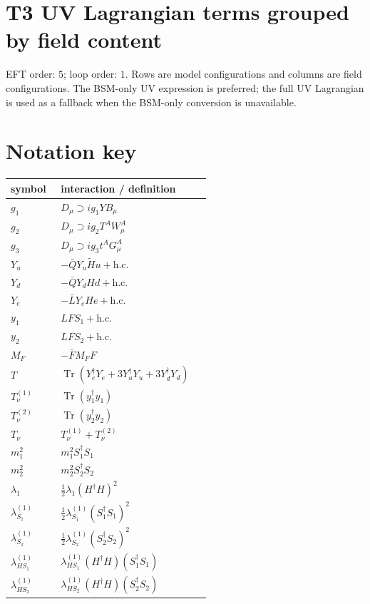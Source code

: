 \documentclass[8pt]{article}
\begin{document}
\begin{landscape}
\section*{T3 UV Lagrangian terms grouped by field content}
EFT order: $5$; loop order: $1$. 
Rows are model configurations and columns are field configurations. The BSM-only UV expression is preferred; the full UV Lagrangian is used as a fallback when the BSM-only conversion is unavailable.
\section*{Notation key}
\begin{longtable}{@{}p{0.23\linewidth}p{0.69\linewidth}@{}}
\toprule
symbol & interaction / definition \\
\midrule
$g_1$ & $D_\mu\supset i g_1YB_\mu$ \\
$g_2$ & $D_\mu\supset i g_2T^AW_\mu^A$ \\
$g_3$ & $D_\mu\supset i g_3t^AG_\mu^A$ \\
$Y_u$ & $-\bar QY_u\widetilde Hu+\mathrm{h.c.}$ \\
$Y_d$ & $-\bar QY_dHd+\mathrm{h.c.}$ \\
$Y_e$ & $-\bar LY_eHe+\mathrm{h.c.}$ \\
$y_1$ & $LFS_1+\mathrm{h.c.}$ \\
$y_2$ & $LFS_2+\mathrm{h.c.}$ \\
$M_F$ & $-\bar FM_FF$ \\
$T$ & $\operatorname{Tr}(Y_e^\dagger Y_e+3Y_u^\dagger Y_u+3Y_d^\dagger Y_d)$ \\
$T_\nu^{(1)}$ & $\operatorname{Tr}(y_1^\dagger y_1)$ \\
$T_\nu^{(2)}$ & $\operatorname{Tr}(y_2^\dagger y_2)$ \\
$T_\nu$ & $T_\nu^{(1)}+T_\nu^{(2)}$ \\
$m_1^2$ & $m_1^2S_1^\dagger S_1$ \\
$m_2^2$ & $m_2^2S_2^\dagger S_2$ \\
$\lambda_1$ & $\frac12\lambda_1(H^\dagger H)^2$ \\
$\lambda_{S_1}^{(1)}$ & $\frac12\lambda_{S_1}^{(1)}(S_1^\dagger S_1)^2$ \\
$\lambda_{S_2}^{(1)}$ & $\frac12\lambda_{S_2}^{(1)}(S_2^\dagger S_2)^2$ \\
$\lambda_{HS_1}^{(1)}$ & $\lambda_{HS_1}^{(1)}(H^\dagger H)(S_1^\dagger S_1)$ \\
$\lambda_{HS_2}^{(1)}$ & $\lambda_{HS_2}^{(1)}(H^\dagger H)(S_2^\dagger S_2)$ \\

\end{longtable}
\end{landscape}
\end{document}
